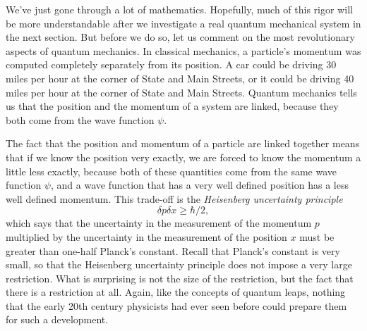 We've just gone through a lot of mathematics. Hopefully, much of this
rigor will be more understandable after we investigate a real quantum
mechanical system in the next section. But before we do so, let us
comment on the most revolutionary aspects of quantum mechanics. In
classical mechanics, a particle's momentum was computed completely
separately from its position. A car could be driving 30 miles per hour
at the corner of State and Main Streets, or it could be driving 40
miles per hour at the corner of State and Main Streets. Quantum
mechanics tells us that the position and the momentum of a system are
linked, because they both come from the wave function $\psi$. 

The fact that the position and momentum of a particle are linked
together means that if we know the position very exactly, we are
forced to know the momentum a little less exactly, because both of
these quantities come from the same wave function $\psi$, and a wave
function that has a very well defined position has a less well defined
momentum. This trade-off is the \emph{Heisenberg uncertainty
principle}
\begin{equation}
	\delta p\delta x \geq \hbar/2,
\end{equation}
which says that the uncertainty in the measurement of the
momentum $p$ multiplied by the uncertainty in the measurement of the
position $x$ must be greater than one-half Planck's constant. Recall
that Planck's constant is very small, so that the Heisenberg
uncertainty principle does not impose a very large restriction. What
is surprising is not the size of the restriction, but the fact that
there is a restriction at all. Again, like the concepts of quantum
leaps, nothing that the early 20th century physicists had ever seen
before could prepare them for such a development.

